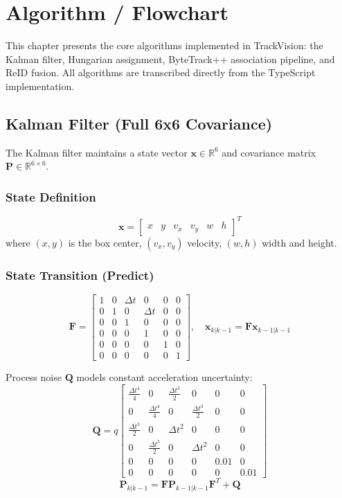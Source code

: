 \chapter{Algorithm / Flowchart}
\label{ch:algorithm}

This chapter presents the core algorithms implemented in TrackVision: the Kalman filter, Hungarian assignment, ByteTrack++ association pipeline, and ReID fusion. All algorithms are transcribed directly from the TypeScript implementation.

\section{Kalman Filter (Full 6x6 Covariance)}
\label{sec:kf-alg}

The Kalman filter maintains a state vector $\mathbf{x} \in \mathbb{R}^6$ and covariance matrix $\mathbf{P} \in \mathbb{R}^{6 \times 6}$.

\subsection{State Definition}
\[
\mathbf{x} = \begin{bmatrix} x & y & v_x & v_y & w & h \end{bmatrix}^T
\]
where $(x,y)$ is the box center, $(v_x, v_y)$ velocity, $(w,h)$ width and height.

\subsection{State Transition (Predict)}
\[
\mathbf{F} = \begin{bmatrix}
1 & 0 & \Delta t & 0 & 0 & 0 \\
0 & 1 & 0 & \Delta t & 0 & 0 \\
0 & 0 & 1 & 0 & 0 & 0 \\
0 & 0 & 0 & 1 & 0 & 0 \\
0 & 0 & 0 & 0 & 1 & 0 \\
0 & 0 & 0 & 0 & 0 & 1
\end{bmatrix}, \quad
\mathbf{x}_{k|k-1} = \mathbf{F} \mathbf{x}_{k-1|k-1}
\]

Process noise $\mathbf{Q}$ models constant acceleration uncertainty:
\[
\mathbf{Q} = q \begin{bmatrix}
\frac{\Delta t^4}{4} & 0 & \frac{\Delta t^3}{2} & 0 & 0 & 0 \\
0 & \frac{\Delta t^4}{4} & 0 & \frac{\Delta t^3}{2} & 0 & 0 \\
\frac{\Delta t^3}{2} & 0 & \Delta t^2 & 0 & 0 & 0 \\
0 & \frac{\Delta t^3}{2} & 0 & \Delta t^2 & 0 & 0 \\
0 & 0 & 0 & 0 & 0.01 & 0 \\
0 & 0 & 0 & 0 & 0 & 0.01
\end{bmatrix}
\]
\[
\mathbf{P}_{k|k-1} = \mathbf{F} \mathbf{P}_{k-1|k-1} \mathbf{F}^T + \mathbf{Q}
\]

